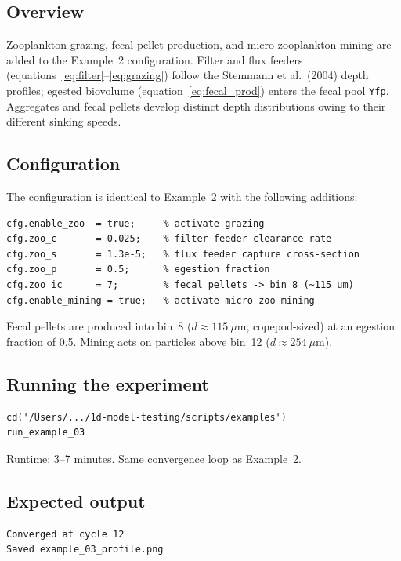 \documentclass[12pt,a4paper]{report}
\numberwithin{equation}{chapter}
\begin{document}
\subsection{Overview}

Zooplankton grazing, fecal pellet production, and micro-zooplankton mining
are added to the Example~2 configuration. Filter and flux feeders
(equations~\ref{eq:filter}--\ref{eq:grazing}) follow the Stemmann et al.\
(2004) depth profiles; egested biovolume (equation~\ref{eq:fecal_prod})
enters the fecal pool \texttt{Yfp}. Aggregates and fecal pellets develop
distinct depth distributions owing to their different sinking speeds.

\subsection{Configuration}

The configuration is identical to Example~2 with the following additions:

\begin{lstlisting}
cfg.enable_zoo  = true;     % activate grazing
cfg.zoo_c       = 0.025;    % filter feeder clearance rate
cfg.zoo_s       = 1.3e-5;   % flux feeder capture cross-section
cfg.zoo_p       = 0.5;      % egestion fraction
cfg.zoo_ic      = 7;        % fecal pellets -> bin 8 (~115 um)
cfg.enable_mining = true;   % activate micro-zoo mining
\end{lstlisting}

Fecal pellets are produced into bin~8 ($d \approx 115~\mu$m,
copepod-sized) at an egestion fraction of 0.5. Mining acts on particles
above bin~12 ($d \approx 254~\mu$m).

\subsection{Running the experiment}

\begin{lstlisting}[numbers=none]
cd('/Users/.../1d-model-testing/scripts/examples')
run_example_03
\end{lstlisting}

Runtime: 3--7 minutes. Same convergence loop as Example~2.

\subsection{Expected output}

\begin{verbatim}
Converged at cycle 12
Saved example_03_profile.png
\end{verbatim}
\end{document}
